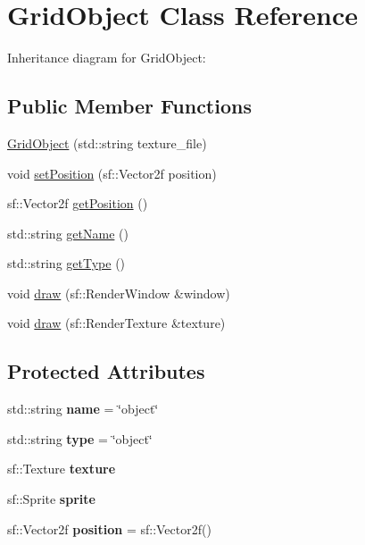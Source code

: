 \hypertarget{classGridObject}{}\section{Grid\+Object Class Reference}
\label{classGridObject}


Inheritance diagram for Grid\+Object\+:
\subsection*{Public Member Functions}
\begin{DoxyCompactItemize}
\item 
\hyperlink{classGridObject_a3387d27277ec570e1055cdd7e14112bd}{Grid\+Object} (std\+::string texture\+\_\+file)
\item 
void \hyperlink{classGridObject_a800ff827249cdd246254cf57f9a1d152}{set\+Position} (sf\+::\+Vector2f position)
\item 
sf\+::\+Vector2f \hyperlink{classGridObject_a3d59640bb036183f9a0236c16764a2e8}{get\+Position} ()
\item 
std\+::string \hyperlink{classGridObject_afc37d553af0c5d387bbb36c0aeb203f2}{get\+Name} ()
\item 
std\+::string \hyperlink{classGridObject_a5198d38a8012f505c058689928cb2fde}{get\+Type} ()
\item 
void \hyperlink{classGridObject_aa0e4a56710d84ca4e9e33dd32c845385}{draw} (sf\+::\+Render\+Window \&window)
\item 
void \hyperlink{classGridObject_acc5d81353ace804015204eba4782a827}{draw} (sf\+::\+Render\+Texture \&texture)
\end{DoxyCompactItemize}
\subsection*{Protected Attributes}
\begin{DoxyCompactItemize}
\item 
\mbox{\label{classGridObject_a1ecdef4380dc8b660b2af9d65a3f3800}} 
std\+::string {\bfseries name} = \char`\"{}object\char`\"{}
\item 
\mbox{\label{classGridObject_a4dc0019e34944f5c5698b9655dd9f4df}} 
std\+::string {\bfseries type} = \char`\"{}object\char`\"{}
\item 
\mbox{\label{classGridObject_a72c02fd0c15cef0a06752b36a6165f09}} 
sf\+::\+Texture {\bfseries texture}
\item 
\mbox{\label{classGridObject_ad2a13cdbd083de822fefe7cbc0cdac7a}} 
sf\+::\+Sprite {\bfseries sprite}
\item 
\mbox{\label{classGridObject_a0c5d70813ab367fe9cd1b885d5786fb9}} 
sf\+::\+Vector2f {\bfseries position} = sf\+::\+Vector2f()
\end{DoxyCompactItemize}


